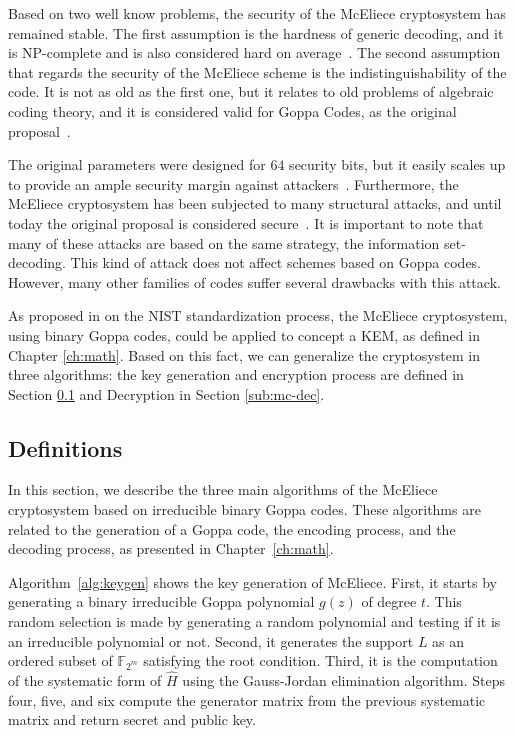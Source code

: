 Based on two well know problems, the security of the McEliece cryptosystem has remained stable. The first assumption is the hardness of generic decoding, and it is NP-complete and is also considered hard on average~\cite{berlekamp1978inherent}. The second assumption that regards the security of the McEliece scheme is the indistinguishability of the code. It is not as old as the first one, but it relates to old problems of algebraic coding theory, and it is considered valid for Goppa Codes, as the original proposal~\cite{faugere2013distinguisher}. 

The original parameters were designed for ${64}$ security bits, but it easily scales up to provide an ample security margin against attackers~\cite{canteaut1998cryptanalysis}. Furthermore, the McEliece cryptosystem has been subjected to many structural attacks, and until today the original proposal is considered secure~\cite{bernstein2008attacking}. It is important to note that many of these attacks are based on the same strategy, the information set-decoding. This kind of attack does not affect schemes based on Goppa codes. However, many other families of codes suffer several drawbacks with this attack. 


As proposed in \cite{bernstein2017classic, bardet2017big} on the NIST standardization process, the McEliece cryptosystem, using binary Goppa codes, could be applied to concept a KEM, as defined in Chapter \ref{ch:math}. Based on this fact, we can generalize the cryptosystem in three algorithms: the key generation and encryption process are defined in Section \ref{sub:mc-def} and Decryption in Section \ref{sub:mc-dec}.

\subsection{Definitions}
\label{sub:mc-def}
In this section, we describe the three main algorithms of the McEliece cryptosystem based on irreducible binary Goppa codes. These algorithms are related to the generation of a Goppa code, the encoding process, and the decoding process, as presented in Chapter~\ref{ch:math}.

Algorithm~\ref{alg:keygen} shows the key generation of McEliece. First, it starts by generating a binary irreducible Goppa polynomial $g(z)$ of degree $t$. This random selection is made by generating a random polynomial and testing if it is an irreducible polynomial or not. Second, it generates the support $L$ as an ordered subset of $\mathbb{F}_{2^m}$ satisfying the root condition. Third, it is the computation of the systematic form of $\hat{H}$ using the Gauss-Jordan elimination algorithm. Steps four, five, and six compute the generator matrix from the previous systematic matrix and return secret and public key.


